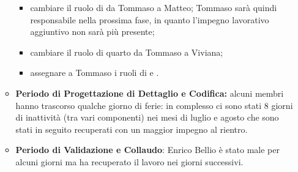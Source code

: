 \begin{itemize}
\begin{itemize}
					\begin{itemize}
						\item cambiare il ruolo di \RES {} da Tommaso a Matteo; Tommaso sarà quindi responsabile nella prossima fase, in quanto l'impegno lavorativo aggiuntivo non sarà più presente;
						\item cambiare il ruolo di quarto \PRJ {} da Tommaso a Viviana;
						\item assegnare a Tommaso i ruoli di \VER{} e \AN.
					\end{itemize}
            \item \textbf{Periodo di Progettazione di Dettaglio e Codifica:} alcuni membri hanno trascorso qualche giorno di ferie: in complesso ci sono stati 8 giorni di inattività (tra vari componenti) nei mesi di luglio e agosto che sono stati in seguito recuperati con un maggior impegno al rientro.
            \item \textbf{Periodo di Validazione e Collaudo}: Enrico Bellio è stato male per alcuni giorni ma ha recuperato il lavoro nei giorni successivi.
			\end{itemize}
		\end{itemize}


